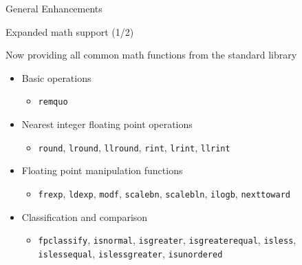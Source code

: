 
\begin{frame}[fragile]

  {\Huge General Enhancements}

  \vspace{10pt}

\end{frame}


\begin{frame}[fragile]{Expanded math support (1/2)}

Now providing all common math functions from the standard library
\begin{itemize}
\item Basic operations
  \begin{itemize}
  \item \texttt{remquo}
  \end{itemize}
\item Nearest integer floating point operations
  \begin{itemize}
  \item \texttt{round}, \texttt{lround}, \texttt{llround}, \texttt{rint}, \texttt{lrint}, \texttt{llrint}
  \end{itemize}
\item Floating point manipulation functions
  \begin{itemize}
  \item \texttt{frexp}, \texttt{ldexp}, \texttt{modf}, \texttt{scalebn}, \texttt{scalebln}, \texttt{ilogb}, \texttt{nexttoward}
  \end{itemize}
\item Classification and comparison
  \begin{itemize}
  \item \texttt{fpclassify}, \texttt{isnormal}, \texttt{isgreater}, \texttt{isgreaterequal}, \texttt{isless}, \texttt{islessequal}, \texttt{islessgreater}, \texttt{isunordered}
  \end{itemize}
\end{itemize}

\end{frame}


